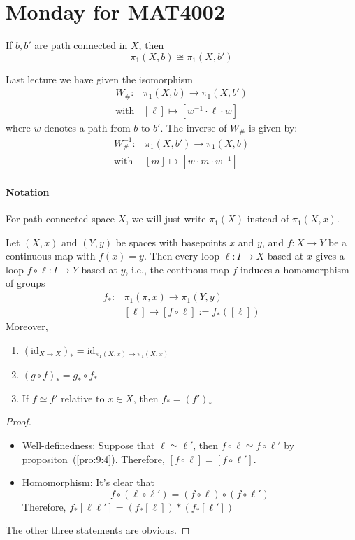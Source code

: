 \section{Monday for MAT4002}
\begin{proposition}
If $b,b'$ are path connected in $X$, then
\[
\pi_1(X,b)\cong \pi_1(X,b')
\]
\end{proposition}
\begin{remark}
Last lecture we have given the isomorphism
\[
\begin{array}{ll}
W_{\#}:&\pi_1(X,b)\to \pi_1(X,b')\\
\text{with}&[\ell]\mapsto[w^{-1}\cdot \ell \cdot w]
\end{array}
\]
where $w$ denotes a path from $b$ to $b'$.
The inverse of $W_{\#}$ is given by:
\[
\begin{array}{ll}
W^{-1}_{\#}:&\pi_1(X,b')\to \pi_1(X,b)\\
\text{with}&[m]\mapsto[w\cdot m \cdot w^{-1}]
\end{array}
\]
\end{remark}
\paragraph{Notation}
For path connected space $X$, we will just write $\pi_1(X)$ instead of $\pi_1(X,x)$.


\begin{proposition}\label{pro:12:4}
Let $(X,x)$ and $(Y,y)$ be spaces with basepoints $x$ and $y$, and $f:X\to Y$ be a continuous map with $f(x)=y$. Then every loop $\ell:I\to X$ based at $x$ gives a loop $f\circ\ell:I\to Y$ based at $y$, i.e., the continous map $f$ induces a homomorphism of groups
\[
\begin{array}{ll}
f_*:&\pi_1(\pi,x)\to\pi_1(Y,y)\\
&[\ell]\mapsto[f\circ\ell]:=f_*([\ell])
\end{array}
\]
Moreover,
\begin{enumerate}
\item
$(\text{id}_{X\to X})_*=\text{id}_{\pi_1(X,x)\to \pi_1(X,x)}$
\item
$(g\circ f)_* = g_*\circ f_*$
\item
If $f\simeq f'$ relative to $x\in X$, then $f_*=(f')_*$
\end{enumerate}
\end{proposition}
\begin{proof}
\begin{itemize}
\item
Well-definedness: 
Suppose that $\ell\simeq\ell'$, then $f\circ \ell\simeq f\circ\ell'$ by propositon~(\ref{pro:9:4}).
Therefore, $[f\circ\ell]=[f\circ\ell']$.
\item
Homomorphism:
It's clear that
\[
f\circ(\ell\circ \ell') = (f\circ\ell)\circ(f\circ \ell')
\]
Therefore, $f_*[\ell\ell']=(f_*[\ell])*(f_*[\ell'])$
\end{itemize}
The other three statements are obvious.

\end{proof}


